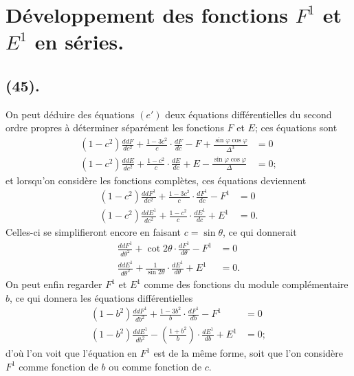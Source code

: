 \documentclass{article}
\begin{document}

\section*{Développement des fonctions $F^{1}$ et $E^{1}$ en séries.}

\subsection*{(45).}

On peut déduire des équations $(e')$ deux équations différentielles du second ordre propres à déterminer séparément les fonctions $F$ et $E$; ces équations sont
\[ \begin{aligned} (1-c^{2})\frac{ddF}{dc^{2}}+\frac{1-3c^{2}}{c}\cdot\frac{dF}{dc}-F+\frac{\sin\varphi\cos\varphi}{\Delta^{3}}&=0\\ (1-c^{2})\frac{ddE}{dc^{2}}+\frac{1-c^{2}}{c}\cdot\frac{dE}{dc}+E-\frac{\sin\varphi\cos\varphi}{\Delta}&=0; \end{aligned} \]
et lorsqu'on considère les fonctions complètes, ces équations deviennent
\[ \begin{aligned} (1-c^{2})\frac{ddF^{1}}{dc^{2}}+\frac{1-3c^{2}}{c}\cdot\frac{dF^{1}}{dc}-F^{1}&=0\\ (1-c^{2})\frac{ddE^{1}}{dc^{2}}+\frac{1-c^{2}}{c}\cdot\frac{dE^{1}}{dc}+E^{1}&=0. \end{aligned} \]
Celles-ci se simplifieront encore en faisant $c=\sin\theta$, ce qui donnerait
\[ \begin{aligned} \frac{ddF^{1}}{d\theta^{2}}+\cot 2\theta\cdot\frac{dF^{1}}{d\theta}-F^{1}&=0\\ \frac{ddE^{1}}{d\theta^{2}}+\frac{1}{\sin 2\theta}\cdot\frac{dE^{1}}{d\theta}+E^{1}&=0. \end{aligned} \]
On peut enfin regarder $F^{1}$ et $E^{1}$ comme des fonctions du module complémentaire $b$, ce qui donnera les équations différentielles
\[ \begin{aligned} (1-b^{2})\frac{ddF^{1}}{db^{2}}+\frac{1-3b^{2}}{b}\cdot\frac{dF^{1}}{db}-F^{1}&=0\\ (1-b^{2})\frac{ddE^{1}}{db^{2}}-\left(\frac{1+b^{2}}{b}\right)\cdot\frac{dE^{1}}{db}+E^{1}&=0; \end{aligned} \]
d'où l'on voit que l'équation en $F^{1}$ est de la même forme, soit que l'on considère $F^{1}$ comme fonction de $b$ ou comme fonction de $c$.
\end{document}
